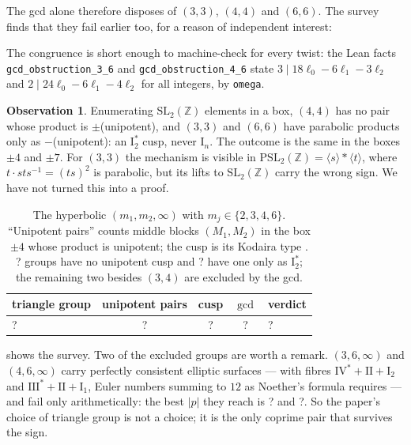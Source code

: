 \documentclass[11pt,a4paper]{article}
\newcommand{\SSNoCuspCount}{?}\newcommand{\SSStarCuspCount}{?}
\newcommand{\SSMinPThreeSix}{?}\newcommand{\SSMinPFourSix}{?}
\newcommand{\SSSurveyTable}{? & ? & ? & ? & ? \\}
\newcommand{\ZZ}{\mathbb{Z}}
\newcommand{\SL}{\mathrm{SL}}
\theoremstyle{plain}
\theoremstyle{definition}
\newtheorem{observation}{Observation}
\begin{document}
The gcd alone therefore disposes of $(3,3)$, $(4,4)$ and $(6,6)$. The
survey finds that they fail earlier too, for a reason of independent
interest:

\begin{sloppypar}
The congruence is short enough to machine-check for every twist: the Lean
facts \texttt{gcd\_obstruction\_3\_6} and \texttt{gcd\_obstruction\_4\_6}
state $3 \mid 18\ell_0 - 6\ell_1 - 3\ell_2$ and $2 \mid 24\ell_0 - 6\ell_1 -
4\ell_2$ for all integers, by \texttt{omega}.
\end{sloppypar}

\begin{observation}
\label{obs:sign}
Enumerating $\SL_2(\ZZ)$ elements in a box, $(4,4)$ has no pair whose
product is $\pm$(unipotent), and $(3,3)$ and $(6,6)$ have parabolic
products only as $-$(unipotent): an $\mathrm{I}_2^*$ cusp, never
$\mathrm{I}_n$. The outcome is the same in the boxes $\pm 4$ and $\pm 7$.
For $(3,3)$ the mechanism is visible in $\mathrm{PSL}_2(\ZZ)
= \langle s\rangle * \langle t\rangle$, where $t \cdot sts^{-1} = (ts)^2$ is
parabolic, but its lifts to $\SL_2(\ZZ)$ carry the wrong sign. We have not
turned this into a proof.
\end{observation}

\begin{table}[t]
\centering
\small
\begin{tabular}{lcccl}
\toprule
triangle group & unipotent pairs & cusp & $\gcd$ & verdict \\
\midrule
\SSSurveyTable
\bottomrule
\end{tabular}
\caption{The \SSSurveyPairsWord{} hyperbolic $(m_1,m_2,\infty)$ with
$m_j \in \{2,3,4,6\}$. ``Unipotent pairs'' counts middle blocks $(M_1, M_2)$
in the box $\pm 4$ whose product is unipotent; the cusp is its Kodaira type \cite{graf2020}.
\SSNoCuspCount{} groups have no unipotent cusp and \SSStarCuspCount{} have
one only as $\mathrm{I}_2^*$; the remaining two besides $(3,4)$ are
excluded by the gcd.}
\label{tab:triangle}
\end{table}

 shows the survey. Two of the excluded groups are worth a
remark. $(3, 6, \infty)$ and $(4, 6, \infty)$ carry perfectly consistent
elliptic surfaces --- with fibres $\mathrm{IV}^* + \mathrm{II} +
\mathrm{I}_2$ and $\mathrm{III}^* + \mathrm{II} + \mathrm{I}_1$, Euler
numbers summing to $12$ as Noether's formula requires --- and fail only
arithmetically: the best $|p|$ they reach is \SSMinPThreeSix{} and
\SSMinPFourSix{}. So the paper's choice of triangle group is not a choice;
it is the only coprime pair that survives the sign.
\end{document}
